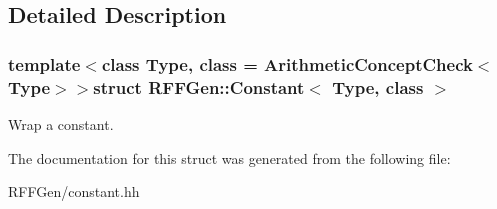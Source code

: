 \subsection{Detailed Description}
\subsubsection*{template$<$class Type, class = Arithmetic\-Concept\-Check$<$\-Type$>$$>$struct R\-F\-F\-Gen\-::\-Constant$<$ Type, class $>$}

Wrap a constant. 

The documentation for this struct was generated from the following file\-:\begin{DoxyCompactItemize}
\item 
R\-F\-F\-Gen/constant.\-hh\end{DoxyCompactItemize}
